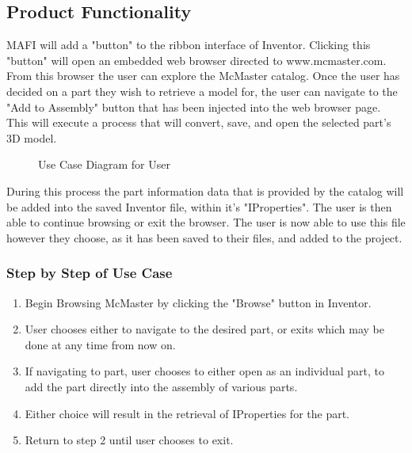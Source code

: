 \documentclass[12pt, letterpaper]{article}
\begin{document}
\subsection{Product Functionality}
MAFI will add a "button" to the ribbon interface of Inventor. Clicking this "button" will open an embedded web browser directed to www.mcmaster.com. 
From this browser the user can explore the McMaster catalog. Once the user has decided on a part they wish to retrieve a model for, the user can navigate 
to the "Add to Assembly" button that has been injected into the web browser page. This will execute a process that will convert, save, and open the selected 
part's 3D model. 

\newpage
\begin{figure}
    \begin{center}
    \end{center}
    \caption{Use Case Diagram for User}
\end{figure}
During this process the part information data that is provided by the catalog will be added into the saved Inventor file, within it's "IProperties". The user is then able to continue browsing or exit the browser. The user is now able to use this file however they choose, as it has been saved to their files, and added to the project.
\subsubsection{Step by Step of Use Case}
\begin{enumerate}
    \item Begin Browsing McMaster by clicking the "Browse" button in Inventor.
    \item User chooses either to navigate to the desired part, or exits which may be done at any time from now on.
    \item If navigating to part, user chooses to either open as an individual part, to add the part directly into the assembly of various parts.
    \item Either choice will result in the retrieval of IProperties for the part.
    \item Return to step 2 until user chooses to exit.
\end{enumerate}
\end{document}
